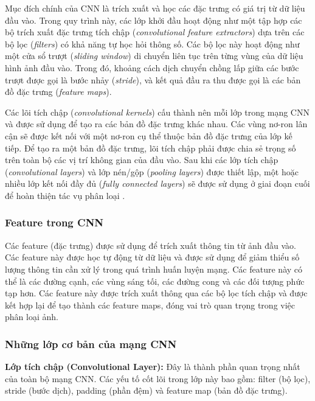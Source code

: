 \documentclass[a4paper,12pt]{article}
\begin{document}
Mục đích chính của CNN là trích xuất và học các đặc trưng có giá trị từ dữ liệu đầu vào. Trong quy trình này, các lớp khởi đầu hoạt động như một tập hợp các bộ trích xuất đặc trưng tích chập (\textit{convolutional feature extractors}) dựa trên các bộ lọc (\textit{filters}) có khả năng tự học hỏi thông số. Các bộ lọc này hoạt động như một cửa sổ trượt (\textit{sliding window}) di chuyển liên tục trên từng vùng của dữ liệu hình ảnh đầu vào. Trong đó, khoảng cách dịch chuyển chồng lấp giữa các bước trượt được gọi là bước nhảy (\textit{stride}), và kết quả đầu ra thu được gọi là các bản đồ đặc trưng (\textit{feature maps}). 

Các lõi tích chập (\textit{convolutional kernels}) cấu thành nên mỗi lớp trong mạng CNN và được sử dụng để tạo ra các bản đồ đặc trưng khác nhau. Các vùng nơ-ron lân cận sẽ được kết nối với một nơ-ron cụ thể thuộc bản đồ đặc trưng của lớp kế tiếp. Để tạo ra một bản đồ đặc trưng, lõi tích chập phải được chia sẻ trọng số trên toàn bộ các vị trí không gian của đầu vào. Sau khi các lớp tích chập (\textit{convolutional layers}) và lớp nén/gộp (\textit{pooling layers}) được thiết lập, một hoặc nhiều lớp kết nối đầy đủ (\textit{fully connected layers}) sẽ được sử dụng ở giai đoạn cuối để hoàn thiện tác vụ phân loại \cite{1}.

\subsubsection{Feature trong CNN} 
Các feature (đặc trưng) được sử dụng để trích xuất thông tin từ ảnh đầu vào. Các feature này được học tự động từ dữ liệu và được sử dụng để giảm thiểu số lượng thông tin cần xử lý trong quá trình huấn luyện mạng. Các feature này có thể là các đường cạnh, các vùng sáng tối, các đường cong và các đối tượng phức tạp hơn. Các feature này được trích xuất thông qua các bộ lọc tích chập và được kết hợp lại để tạo thành các feature maps, đóng vai trò quan trọng trong việc phân loại ảnh.

\subsubsection{Những lớp cơ bản của mạng CNN} 

\textbf{Lớp tích chập (Convolutional Layer):} Đây là thành phần quan trọng nhất của toàn bộ mạng CNN. Các yếu tố cốt lõi trong lớp này bao gồm: filter (bộ lọc), stride (bước dịch), padding (phần đệm) và feature map (bản đồ đặc trưng).
\end{document}
